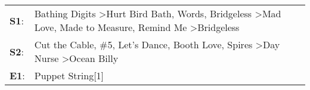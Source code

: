 \begin{supertabular}{p{0.03\textwidth}p{0.92\textwidth}}
 \textbf{S1}:  &  Bathing Digits\textsuperscript{} \textgreater \enspace Hurt Bird Bath\textsuperscript{}, \enspace Words\textsuperscript{}, \enspace Bridgeless\textsuperscript{} \textgreater \enspace Mad Love\textsuperscript{}, \enspace Made to Measure\textsuperscript{}, \enspace Remind Me\textsuperscript{} \textgreater \enspace Bridgeless\textsuperscript{}  \enspace  \\
 \textbf{S2}:  &                                                                 Cut the Cable\textsuperscript{}, \enspace \#5\textsuperscript{}, \enspace Let's Dance\textsuperscript{}, \enspace Booth Love\textsuperscript{}, \enspace Spires\textsuperscript{} \textgreater \enspace Day Nurse\textsuperscript{} \textgreater \enspace Ocean Billy\textsuperscript{}  \enspace  \\
 \textbf{E1}:  &                                                                                                                                                                                                                                                                                                                      Puppet String[1]\textsuperscript{}  \enspace  \\
\end{supertabular}
